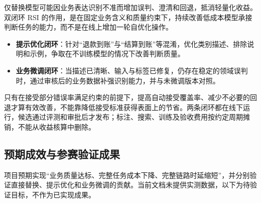 \documentclass[UTF8,a4paper,11pt,fontset=windows]{ctexart}
\begin{document}
仅替换模型可能因业务表达识别不准而增加误判、澄清和回退，抵消轻量化收益。双闭环 RSI 的作用，是在固定业务含义和质量约束下，持续改善低成本模型承接判断任务的能力，而不是在线上增加一轮自优化操作。


\begin{itemize}

\item \textbf{提示优化闭环}：针对“退款到账”与“结算到账”等混淆，优化类别描述、排除说明和示例，争取在不训练模型的情况下改善判断质量。

\item \textbf{业务微调闭环}：当描述已清晰、输入与标签已修复，仍存在稳定的领域误判时，通过审核后的业务数据补强识别能力，并与未微调版本对照。

\end{itemize}

只有在接受部分错误率满足约束的前提下，提高自动接受覆盖率、减少不必要的回退才算有效改善，不能靠降低接受标准获得表面上的节省。两条闭环都在线下运行，候选通过评测和审批后才发布；标注、搜索、训练及验收费用按约定周期摊销，不能从收益核算中删除。


\subsection{预期成效与参赛验证成果}

项目预期实现“业务质量达标、完整任务成本下降、完整链路时延缩短”，并分别验证直接替换、提示优化和业务微调的贡献。当前文档未提供实测数据，以下为待验证目标，不作为已实现成果。
\end{document}
